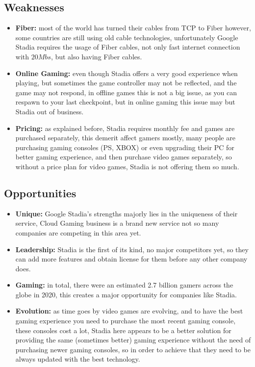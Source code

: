 \subsection{Weaknesses}
\begin{itemize}    
    \item \textbf{Fiber:} 
        most of the world has turned their cables from TCP to Fiber however, some countries are still using
        old cable technologies, unfortunately Google Stadia requires the usage of Fiber cables,
        not only fast internet connection with $20Mbs$, but also having Fiber cables.
    \item \textbf{Online Gaming:}
        even though Stadia offers a very good experience when playing, but sometimes the game controller
        may not be reflected, and the game may not respond, in offline games this is not a big issue, as you
        can respawn to your last checkpoint, but in online gaming this issue may but Stadia out of business.
    \item \textbf{Pricing:}
        as explained before, Stadia requires monthly fee and games are purchased separately, this demerit affect 
        gamers mostly, many people are purchasing gaming consoles (PS, XBOX) or even upgrading their PC for better gaming
        experience, and then purchase video games separately, so without a price plan for video games, Stadia is not
        offering them so much.
\end{itemize}

\subsection{Opportunities}
\begin{itemize}    
    \item \textbf{Unique:} 
        Google Stadia's strengths majorly lies in the uniqueness of their service,
        Cloud Gaming business is a brand new service not so many companies are competing in this
        area yet.

    \item \textbf{Leadership:}
        Stadia is the first of its kind, no major competitors yet, so they can add more features and obtain license for them
        before any other company does.
    
    \item \textbf{Gaming:}
        in total, there were an estimated 2.7 billion gamers across the globe in 2020, this creates a major opportunity
        for companies like Stadia.

    \item \textbf{Evolution:}
        as time goes by video games are evolving, and to have the best gaming experience you need to purchase the
        most recent gaming console, these consoles cost a lot, Stadia here appears to be a better solution
        for providing the same (sometimes better) gaming experience without the need of purchasing newer gaming
        consoles, so in order to achieve that they need to be always updated with the best technology.
\end{itemize}


